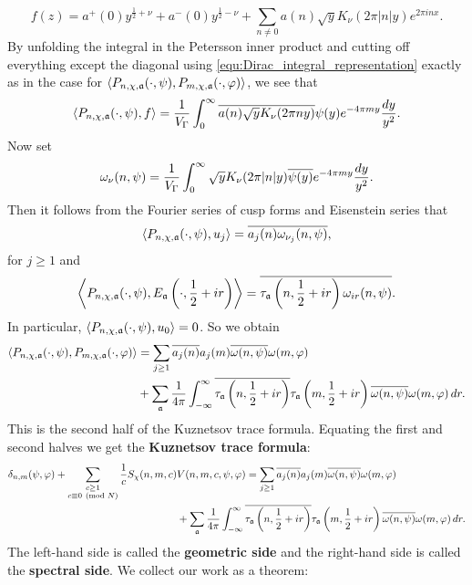 \documentclass[12pt,oneside]{book}
\begin{document}
    \[
      f(z) = a^{+}(0)y^{\frac{1}{2}+\nu}+a^{-}(0)y^{\frac{1}{2}-\nu}+\sum_{n \neq 0}a(n)\sqrt{y}K_{\nu}(2\pi|n|y)e^{2\pi inx}.
    \]
    By unfolding the integral in the Petersson inner product and cutting off everything except the diagonal using \cref{equ:Dirac_integral_representation} exactly as in the case for $\langle P_{n,\chi,\mathfrak{a}}(\cdot,\psi),P_{m,\chi,\mathfrak{a}}(\cdot,\varphi)\rangle$, we see that
    \[
      \langle P_{n,\chi,\mathfrak{a}}(\cdot,\psi),f\rangle = \frac{1}{V_{\Gamma}}\int_{0}^{\infty}\overline{a(n)\sqrt{y}K_{\nu}(2\pi ny)}\psi(y)e^{-4\pi my}\frac{dy}{y^{2}}.
    \]
    Now set
    \[
      \omega_{\nu}(n,\psi) = \frac{1}{V_{\Gamma}}\int_{0}^{\infty}\sqrt{y}K_{\nu}(2\pi|n|y)\overline{\psi(y)}e^{-4\pi my}\frac{dy}{y^{2}}.
    \]
    Then it follows from the Fourier series of cusp forms and Eisenstein series that
    \[
      \langle P_{n,\chi,\mathfrak{a}}(\cdot,\psi),u_{j}\rangle = \overline{a_{j}(n)\omega_{\nu_{j}}(n,\psi)},
    \]
    for $j \ge 1$ and
    \[
      \left\langle P_{n,\chi,\mathfrak{a}}(\cdot,\psi),E_{\mathfrak{a}}\left(\cdot,\frac{1}{2}+ir\right)\right\rangle = \overline{\tau_{\mathfrak{a}}\left(n,\frac{1}{2}+ir\right)\omega_{ir}(n,\psi)}.
    \]
    In particular, $\langle P_{n,\chi,\mathfrak{a}}(\cdot,\psi),u_{0}\rangle = 0$. So we obtain
    \begin{align*}
      \langle P_{n,\chi,\mathfrak{a}}(\cdot,\psi),P_{m,\chi,\mathfrak{a}}(\cdot,\varphi)\rangle &= \sum_{j \ge 1}\overline{a_{j}(n)}a_{j}(m)\overline{\omega(n,\psi)}\omega(m,\varphi) \\
      &+\sum_{\mathfrak{a}}\frac{1}{4\pi}\int_{-\infty}^{\infty}\overline{\tau_{\mathfrak{a}}\left(n,\frac{1}{2}+ir\right)}\tau_{\mathfrak{a}}\left(m,\frac{1}{2}+ir\right)\overline{\omega(n,\psi)}\omega(m,\varphi)\,dr.
    \end{align*}
    This is the second half of the Kuznetsov trace formula. Equating the first and second halves we get the \textbf{Kuznetsov trace formula}:
    \begin{align*}
      \delta_{n,m}(\psi,\varphi)+\sum_{\substack{c \ge 1 \\ c \equiv 0 \ \left(\text{mod }N\right)}}\frac{1}{c}S_{\chi}(n,m,c)&V(n,m,c,\psi,\varphi) = \sum_{j \ge 1}\overline{a_{j}(n)}a_{j}(m)\overline{\omega(n,\psi)}\omega(m,\varphi) \\
      &+\sum_{\mathfrak{a}}\frac{1}{4\pi}\int_{-\infty}^{\infty}\overline{\tau_{\mathfrak{a}}\left(n,\frac{1}{2}+ir\right)}\tau_{\mathfrak{a}}\left(m,\frac{1}{2}+ir\right)\overline{\omega(n,\psi)}\omega(m,\varphi)\,dr.
    \end{align*}
    The left-hand side is called the \textbf{geometric side} and the right-hand side is called the \textbf{spectral side}. We collect our work as a theorem:
\end{document}
